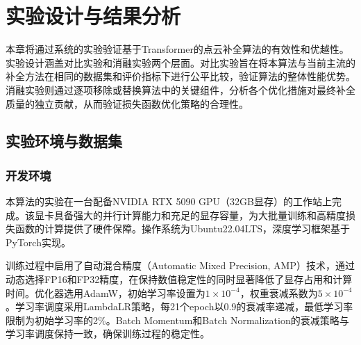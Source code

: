 \chapter{实验设计与结果分析}
\label{cha:experiment}

本章将通过系统的实验验证基于Transformer的点云补全算法的有效性和优越性。实验设计涵盖对比实验和消融实验两个层面。对比实验旨在将本算法与当前主流的补全方法在相同的数据集和评价指标下进行公平比较，验证算法的整体性能优势。消融实验则通过逐项移除或替换算法中的关键组件，分析各个优化措施对最终补全质量的独立贡献，从而验证损失函数优化策略的合理性。

\section{实验环境与数据集}

\subsection{开发环境}

本算法的实验在一台配备NVIDIA RTX 5090 GPU（32GB显存）的工作站上完成。该显卡具备强大的并行计算能力和充足的显存容量，为大批量训练和高精度损失函数的计算提供了硬件保障。操作系统为Ubuntu22.04LTS，深度学习框架基于PyTorch实现。

训练过程中启用了自动混合精度（Automatic Mixed Precision, AMP）技术，通过动态选择FP16和FP32精度，在保持数值稳定性的同时显著降低了显存占用和计算时间。优化器选用AdamW，初始学习率设置为$1 \times 10^{-4}$，权重衰减系数为$5 \times 10^{-4}$。学习率调度采用LambdaLR策略，每21个epoch以0.9的衰减率递减，最低学习率限制为初始学习率的2\%。Batch Momentum和Batch Normalization的衰减策略与学习率调度保持一致，确保训练过程的稳定性。




